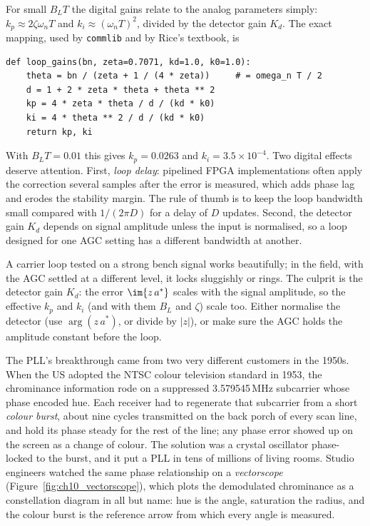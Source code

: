 For small $B_LT$ the digital gains relate to the analog parameters simply:
$k_p\approx2\zeta\omega_nT$ and $k_i\approx(\omega_nT)^2$, divided by the detector gain $K_d$. The
exact mapping, used by \texttt{commlib} and by Rice's textbook, is
\begin{lstlisting}
def loop_gains(bn, zeta=0.7071, kd=1.0, k0=1.0):
    theta = bn / (zeta + 1 / (4 * zeta))     # = omega_n T / 2
    d = 1 + 2 * zeta * theta + theta ** 2
    kp = 4 * zeta * theta / d / (kd * k0)
    ki = 4 * theta ** 2 / d / (kd * k0)
    return kp, ki
\end{lstlisting}
With $B_LT=0.01$ this gives $k_p=0.0263$ and $k_i=3.5\times10^{-4}$. Two digital effects deserve
attention. First, \emph{loop delay}: pipelined FPGA implementations often apply the correction
several samples after the error is measured, which adds phase lag and erodes the stability margin.
The rule of thumb is to keep the loop bandwidth small compared with $1/(2\pi D)$ for a delay of $D$
updates. Second, the detector gain $K_d$ depends on signal amplitude unless the input is
normalised, so a loop designed for one AGC setting has a different bandwidth at another.

\begin{pitfall}
A carrier loop tested on a strong bench signal works beautifully; in the field, with the AGC
settled at a different level, it locks sluggishly or rings. The culprit is the detector gain
$K_d$: the error $\im\{z\,a^*\}$ scales with the signal amplitude, so the effective $k_p$ and $k_i$
(and with them $B_L$ and $\zeta$) scale too. Either normalise the detector (use $\arg(z\,a^*)$, or
divide by $|z|$), or make sure the AGC holds the amplitude constant before the loop.
\end{pitfall}

\begin{history}
The PLL's breakthrough came from two very different customers in the 1950s. When the US adopted the
NTSC colour television standard in 1953, the chrominance information rode on a suppressed
3.579545\,MHz subcarrier whose phase encoded hue. Each receiver had to regenerate that subcarrier
from a short \emph{colour burst}, about nine cycles transmitted on the back porch of every scan
line, and hold its phase steady for the rest of the line; any phase error showed up on the screen as
a change of colour. The solution was a crystal oscillator phase-locked to the burst, and it put a
PLL in tens of millions of living rooms. Studio engineers watched the same phase relationship on a
\emph{vectorscope} (Figure~\ref{fig:ch10_vectorscope}), which plots the demodulated chrominance as
a constellation diagram in all but name: hue is the angle, saturation the radius, and the colour
burst is the reference arrow from which every angle is measured.
\end{history}

